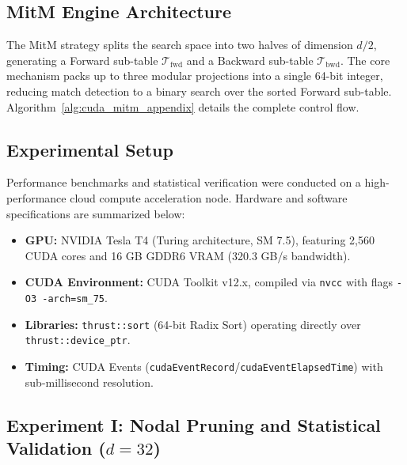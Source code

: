\documentclass[11pt,a4paper]{article}
\theoremstyle{plain}
\theoremstyle{definition}
\numberwithin{equation}{section}
\newcommand{\cT}{\mathcal{T}}
\begin{document}
\subsection{MitM Engine Architecture}
\label{subsec:arquitectura_mitm}

The MitM strategy splits the search space into two halves of dimension $d/2$, generating a Forward sub-table $\cT_{\text{fwd}}$ and a Backward sub-table $\cT_{\text{bwd}}$. The core mechanism packs up to three modular projections into a single 64-bit integer, reducing match detection to a binary search over the sorted Forward sub-table. Algorithm~\ref{alg:cuda_mitm_appendix} details the complete control flow.

\subsection{Experimental Setup}
\label{subsec:configuracion}

Performance benchmarks and statistical verification were conducted on a high-performance cloud compute acceleration node. Hardware and software specifications are summarized below:

\begin{itemize}
    \item \textbf{GPU:} NVIDIA Tesla T4 (Turing architecture, SM 7.5), featuring 2,560 CUDA cores and 16 GB GDDR6 VRAM (320.3 GB/s bandwidth).
    \item \textbf{CUDA Environment:} CUDA Toolkit v12.x, compiled via \texttt{nvcc} with flags \texttt{-O3 -arch=sm\_75}.
    \item \textbf{Libraries:} \texttt{thrust::sort} (64-bit Radix Sort) operating directly over \texttt{thrust::device\_ptr}.
    \item \textbf{Timing:} CUDA Events (\texttt{cudaEventRecord}/\texttt{cudaEventElapsedTime}) with sub-millisecond resolution.
\end{itemize}


\subsection{Experiment I: Nodal Pruning and Statistical Validation (\texorpdfstring{$d=32$}{d=32})}
\label{subsec:exp1_d32}
\end{document}
